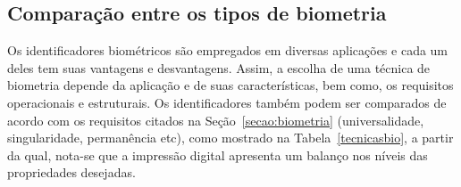 \subsection{Comparação entre os tipos de biometria}

  Os identificadores biométricos são empregados em diversas aplicações e cada um deles tem suas vantagens e desvantagens. Assim, a escolha de uma técnica de biometria depende da aplicação e de suas características, bem como, os requisitos operacionais e estruturais. Os identificadores também podem ser comparados de acordo com os requisitos citados na Seção~\ref{secao:biometria} (universalidade, singularidade, permanência etc), como mostrado na Tabela~\ref{tecnicasbio}, a partir da qual, nota-se que a impressão digital apresenta um balanço nos níveis das propriedades desejadas.



